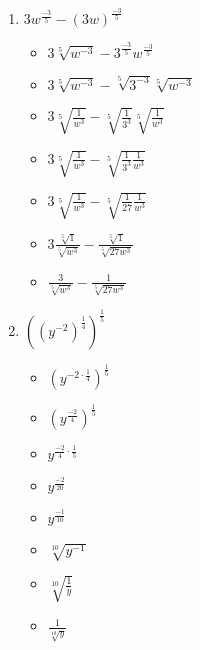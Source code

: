 \documentclass{article}
\begin{document}
\begin{onehalfspace}
\begin{enumerate}[start=53]
        \item $3w^{\frac{-3}{5}} - (3w)^{\frac{-3}{5}}$
        \begin{itemize}
            \item $3 \sqrt[5]{w^{-3}} - 3^{\frac{-3}{5}} w^{\frac{-3}{5}}$
            \item $3 \sqrt[5]{w^{-3}} - \sqrt[5]{3^{-3}} \sqrt[5]{w^{-3}}$
            \item $3 \sqrt[5]{\frac{1}{w^{3}}} - \sqrt[5]{\frac{1}{3^{3}}} \sqrt[5]{\frac{1}{w^{3}}}$
            \item $3 \sqrt[5]{\frac{1}{w^{3}}} - \sqrt[5]{\frac{1}{3^{3}}\frac{1}{w^{3}}}$
            \item $3 \sqrt[5]{\frac{1}{w^{3}}} - \sqrt[5]{\frac{1}{27}\frac{1}{w^{3}}}$
            \item $3 \frac{\sqrt[5]{1}}{\sqrt[5]{w^{3}}} - \frac{\sqrt[5]{1}}{\sqrt[5]{27w^{3}}}$
            \item $\frac{3}{\sqrt[5]{w^{3}}} - \frac{1}{\sqrt[5]{27w^{3}}}$
        \end{itemize}
        
        \item $\left( (y^{-2})^{\frac{1}{4}} \right)^{\frac{1}{5}}$
        \begin{itemize}
            \item $\left( y^{-2 \cdot \frac{1}{4}} \right)^{\frac{1}{5}}$
            \item $\left( y^{\frac{-2}{4}} \right)^{\frac{1}{5}}$
            \item $y^{\frac{-2}{4} \cdot \frac{1}{5}}$
            \item $y^{\frac{-2}{20}}$
            \item $y^{\frac{-1}{10}}$
            \item $\sqrt[10]{y^{-1}}$
            \item $\sqrt[10]{\frac{1}{y}}$
            \item $\frac{1}{\sqrt[10]{y}}$
        \end{itemize}
     \end{enumerate}
\end{onehalfspace}
\end{document}

